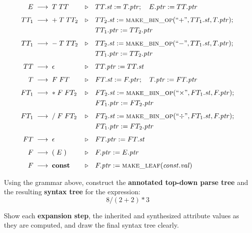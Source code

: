 \documentclass[12pt]{exam}
\begin{document}
\begin{questions}
\begin{align*}
  E   &\;\longrightarrow\; T\;TT
    &\triangleright\quad& TT.\mathit{st} := T.\mathit{ptr};\quad E.\mathit{ptr} := TT.\mathit{ptr} \\[4pt]
  TT_1 &\;\longrightarrow\; +\;T\;TT_2
    &\triangleright\quad& TT_2.\mathit{st} := \textsc{make\_bin\_op}(\text{``+''}, TT_1.\mathit{st}, T.\mathit{ptr});\\
   &&& TT_1.\mathit{ptr} := TT_2.\mathit{ptr} \\[4pt]
  TT_1 &\;\longrightarrow\; -\;T\;TT_2
    &\triangleright\quad& TT_2.\mathit{st} := \textsc{make\_bin\_op}(\text{``$-$''}, TT_1.\mathit{st}, T.\mathit{ptr});\\
   &&& TT_1.\mathit{ptr} := TT_2.\mathit{ptr} \\[4pt]
  TT  &\;\longrightarrow\; \epsilon
    &\triangleright\quad& TT.\mathit{ptr} := TT.\mathit{st} \\[4pt]
  T   &\;\longrightarrow\; F\;FT
    &\triangleright\quad& FT.\mathit{st} := F.\mathit{ptr};\quad T.\mathit{ptr} := FT.\mathit{ptr} \\[4pt]
  FT_1 &\;\longrightarrow\; \ast\;F\;FT_2
    &\triangleright\quad& FT_2.\mathit{st} := \textsc{make\_bin\_op}(\text{``$\times$''}, FT_1.\mathit{st}, F.\mathit{ptr});\\
   &&& FT_1.\mathit{ptr} := FT_2.\mathit{ptr} \\[4pt]
  FT_1 &\;\longrightarrow\; /\;F\;FT_2
    &\triangleright\quad& FT_2.\mathit{st} := \textsc{make\_bin\_op}(\text{``$\div$''}, FT_1.\mathit{st}, F.\mathit{ptr});\\
   &&& FT_1.\mathit{ptr} := FT_2.\mathit{ptr} \\[4pt]
  FT  &\;\longrightarrow\; \epsilon
    &\triangleright\quad& FT.\mathit{ptr} := FT.\mathit{st} \\[4pt]
  F   &\;\longrightarrow\; (\;E\;)
    &\triangleright\quad& F.\mathit{ptr} := E.\mathit{ptr} \\[4pt]
  F   &\;\longrightarrow\; \textbf{const}
    &\triangleright\quad& F.\mathit{ptr} := \textsc{make\_leaf}(\mathit{const.val})
\end{align*}

\medskip
\noindent Using the grammar above, construct the \textbf{annotated top-down parse
tree} and the resulting \textbf{syntax tree} for the expression:
\[
  8 / (2 + 2) \ast 3
\]

\medskip
\noindent Show each \textbf{expansion step}, the inherited and synthesized
attribute values as they are computed, and draw the final syntax tree clearly.


\end{questions}
\end{document}
